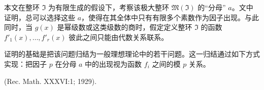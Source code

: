\documentclass[11pt]{article}
\begin{document}
本文在整环 $\mathfrak{I}$ 为有限生成的假设下，考察该极大整环 $\mathfrak{M}(\mathfrak{I})$ 的“分母” $a$。文中证明，总可以选择这些 $a$，使得在其全体中只有有限多个素数作为因子出现。与此同时，当 $g(x)$ 是幂级数或这类级数的商时，假定定义整环 $\mathfrak{I}$ 的函数 $f'_1(x),\ldots,f'_r(x)$ 彼此之间只能由代数关系联系。

证明的基础是把该问题归结为一般理想理论中的若干问题。这一归结通过如下方式实现：把因子 $p$ 在分母 $a$ 中的出现视为函数 $f_i$ 之间的模 $p$ 关系。

\begin{center}
(Rec. Math. XXXVI:1; 1929).
\end{center}
\endgroup

\setcounter{footnote}{0}
\clearpage
\end{document}
